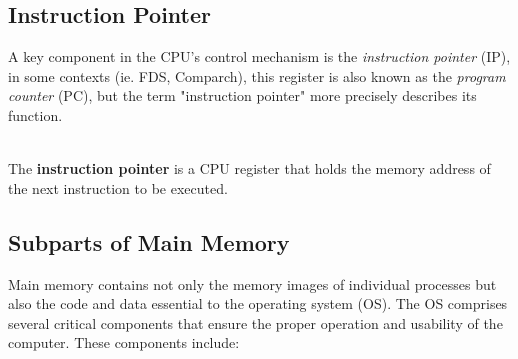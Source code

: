 \documentclass[../../compsys.tex]{subfiles}
\begin{document}
\subsection{Instruction Pointer}
A key component in the CPU's control mechanism is the \emph{instruction pointer} (IP), in some contexts (ie. FDS, Comparch), this register is also known as the \emph{program counter} (PC), but the term "instruction pointer" more precisely describes its function.
\vspace{10px}
\begin{definition}
\leavevmode\\[5px]
The \textbf{instruction pointer} is a CPU register that holds the memory address of the next instruction to be executed.
\end{definition}
\vspace{5px}
\subsection{Subparts of Main Memory}
Main memory contains not only the memory images of individual processes but also the code and data essential to the operating system (OS). The OS comprises several critical components that ensure the proper operation and usability of the computer. These components include:
\end{document}

